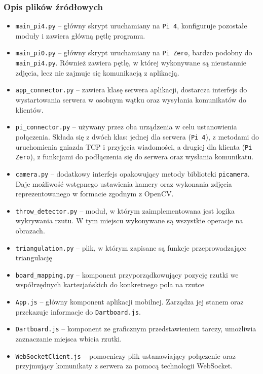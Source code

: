 \subsubsection{Opis plików źródłowych}
\begin{itemize}
  \item \verb|main_pi4.py| -- główny skrypt uruchamiany na \verb|Pi 4|, konfiguruje pozostałe moduły i zawiera główną pętlę programu.
  \item \verb|main_pi0.py| -- główny skrypt uruchamiany na \verb|Pi Zero|, bardzo podobny do \verb|main_pi4.py|. Również zawiera pętlę, w której wykonywane są nieustannie zdjęcia, lecz nie zajmuje się komunikacją z aplikacją.
  \item \verb|app_connector.py| -- zawiera klasę serwera aplikacji, dostarcza interfejs do wystartowania serwera w osobnym wątku oraz wysyłania komunikatów do klientów.
  \item \verb|pi_connector.py| -- używany przez oba urządzenia w celu ustanowienia połączenia. Składa się z dwóch klas: jednej dla serwera (\verb|Pi 4|), z metodami do uruchomienia gniazda TCP i przyjęcia wiadomości, a drugiej dla klienta (\verb|Pi Zero|), z funkcjami do podłączenia się do serwera oraz wysłania komunikatu.
  \item \verb|camera.py| -- dodatkowy interfejs opakowujący metody biblioteki \verb|picamera|. Daje możliwość wstępnego ustawienia kamery oraz wykonania zdjęcia reprezentowanego w formacie zgodnym z OpenCV.
  \item \verb|throw_detector.py| -- moduł, w którym zaimplementowana jest logika wykrywania rzutu. W tym miejscu wykonywane są wszystkie operacje na obrazach.
  \item \verb|triangulation.py| -- plik, w którym zapisane są funkcje przeprowadzające triangulację
  \item \verb|board_mapping.py| -- komponent przyporządkowujący pozycję rzutki we współrzędnych kartezjańskich do konkretnego pola na rzutce
  \item \verb|App.js| -- główny komponent aplikacji mobilnej. Zarządza jej stanem oraz przekazuje informacje do \verb|Dartboard.js|.
  \item \verb|Dartboard.js| -- komponent ze graficznym przedstawieniem tarczy, umożliwia zaznaczanie miejsca wbicia rzutki.
  \item \verb|WebSocketClient.js| -- pomocniczy plik ustanawiający połączenie oraz przyjmujący komunikaty z serwera za pomocą technologii WebSocket.
  
\end{itemize}

